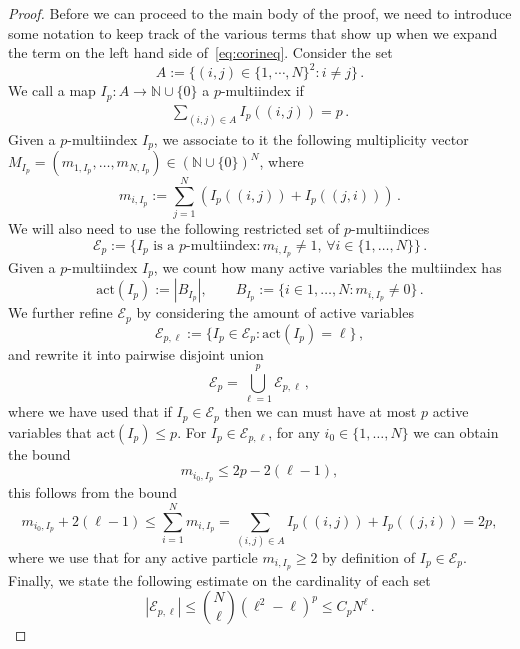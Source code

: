 \documentclass[a4paper,10pt,twoside]{amsart}
\theoremstyle{remark}
\theoremstyle{definition}
\numberwithin{equation}{section}
\newcommand{\N}{\mathbb{N}}
\newcommand{\0}{{\bf 0}}
\newcommand{\+}{\hspace{-.5ex}+\hspace{-.5ex}}
\begin{document}
\begin{proof}
  Before we can proceed to the main body of the proof, we need to introduce some notation to keep track of the various terms that show up when we expand the term on the left hand side of~\eqref{eq:corineq}. Consider the set  
\begin{equation}
\label{eq:defI}
A:= \{(i,j)\in \{1,\cdots,N\}^2:i\neq j\}\, .
\end{equation}
We call a map $I_p:A \to \N\cup\{0\}$ a $p$-multiindex if 
\begin{align}
\sum_{(i,j)\in A}I_p((i,j))=p\, .
\end{align}
Given a $p$-multiindex $I_p$, we associate to it the following multiplicity vector $M_{I_p}= (m_{1,I_p},\dots,m_{N,I_p})\in (\N\cup\{0\})^N$, where
\begin{equation}
m_{i,I_p}:= \sum_{j =1}^N \left(I_p((i,j)) + I_p((j,i))\right)\, .
\end{equation}
We will also need to use the following restricted set of $p$-multiindices
\begin{equation}
\label{eq:restrictedset}
\mathcal{E}_{p}:= \{I_p \text{ is a }p \text{-multiindex}:m_{i,I_p}\neq 1,\, \forall i \in \{1,\dots,N\}\}\,.
\end{equation}
Given a $p$-multiindex $I_p$, we count how many active variables the multiindex has
\begin{equation}
\mathrm{act}(I_p):=\left|B_{I_p}\right|, \qquad B_{I_p}:=\{i \in {1, \dots,N}:m_{i,I_p}\neq 0\}\,.
\end{equation}
We further refine $\mathcal{E}_p$ by considering the amount of active variables
\begin{equation}
\mathcal{E}_{p,\ell}:= \{I_p \in \mathcal{E}_{p}: \mathrm{act}(I_p)=\ell\}\,,
\end{equation}
and rewrite it into pairwise disjoint union
\begin{equation}
\mathcal{E}_p= \bigcup_{\ell=1}^p \mathcal{E}_{p,\ell}\, ,
\end{equation}
where we have used that if $I_p \in \mathcal{E}_p$ then we can must have  at most $p$ active variables that $\mathrm{act}(I_p) \leq p$. For $I_p\in\mathcal{E}_{p,\ell}$, for any $i_0\in \{1,\dots,N\}$ we can obtain the bound
\begin{equation}\label{boundonmi}
    m_{i_0,I_{p}}\le 2p-2(\ell-1),
\end{equation}
this follows from the bound
$$
m_{i_0,I_{p}}+2(\ell-1) \le \sum_{i=1}^Nm_{i,I_{p}}=\sum_{(i,j)\in A}I_p((i,j))+I_p((j,i))=2p,
$$
where we use that for any active particle $m_{i,I_{p}}\ge 2$ by definition of $I_p\in\mathcal{E}_p$. Finally, we state the following estimate on the cardinality of each set
\begin{equation}
|\mathcal{E}_{p,\ell}|\le  {N\choose\ell}(\ell^2 -\ell)^p\le C_p N^{\ell}
\label{eq:sizeE}\, .
\end{equation}



\end{proof}
\end{document}
